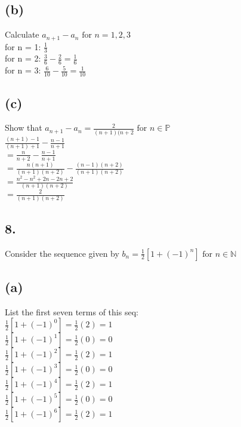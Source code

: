 \documentclass[11pt]{article}
\begin{document}
\subsection*{(b)}
\begin{center}
Calculate $a_{n+1}-a_{n} \text{ for } n = 1, 2, 3$\\
\hfill \break
for n = 1: $\frac{1}{3}$\\
for n = 2: $\frac{3}{6}-\frac{2}{6} = \frac{1}{6}$\\
for n = 3: $\frac{6}{10}-\frac{5}{10} = \frac{1}{10}$\\
\end{center}

\subsection*{(c)}
\begin{center}
Show that $a_{n+1}-a_{n}  = \frac{2}{(n+1)(n+2} \text{ for } n \in \mathbb{P}$\\
\hfill \break
$\frac{(n+1)-1}{(n+1)+1} - \frac{n-1}{n+1}$\\
$=\frac{n}{n+2} - \frac{n-1}{n+1}$\\
$=\frac{n(n+1)}{(n+1)(n+2)} - \frac{(n-1)(n+2)}{(n+1)(n+2)}$\\
$=\frac{n^{2}-n^{2}+2n-2n+2}{(n+1)(n+2)}$\\
$=\frac{2}{(n+1)(n+2)}$\\
\end{center}
%
%
\subsection*{8.}
\begin{center}
Consider the sequence given by $b_{n} = \frac{1}{2} [1 + (-1)^{n}] \text{ for } n \in \mathbb{N}$
\end{center}

\subsection*{(a)}
\begin{center}
List the first seven terms of this seq:\\
\hfill \break
$\frac{1}{2} [1 + (-1)^{0}] = \frac{1}{2} (2) = 1$\\
$\frac{1}{2} [1 + (-1)^{1}] = \frac{1}{2} (0) = 0$\\
$\frac{1}{2} [1 + (-1)^{2}] = \frac{1}{2} (2) = 1$\\
$\frac{1}{2} [1 + (-1)^{3}] = \frac{1}{2} (0) = 0$\\
$\frac{1}{2} [1 + (-1)^{4}] = \frac{1}{2} (2) = 1$\\
$\frac{1}{2} [1 + (-1)^{5}] = \frac{1}{2} (0) = 0$\\
$\frac{1}{2} [1 + (-1)^{6}] = \frac{1}{2} (2) = 1$\\
\end{center}
\end{document}
